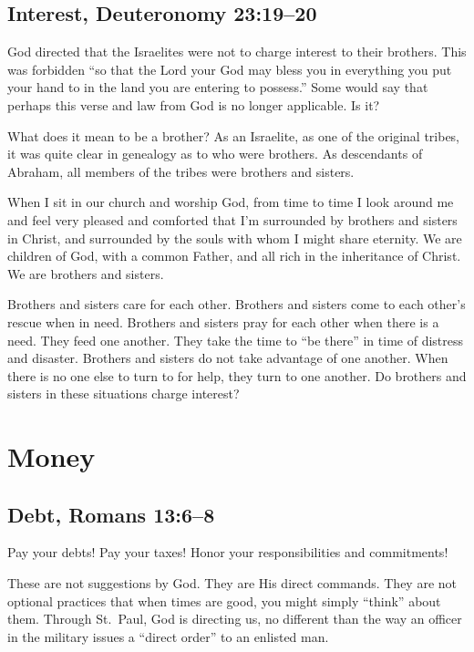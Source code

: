 \documentclass[12pt]{memoir}
\begin{document}
\subsection{Interest, Deuteronomy 23:19--20}

God directed that the Israelites were not to charge interest to their
brothers. This was forbidden ``so that the Lord your God may bless
you in everything you put your hand to in the land you are entering
to possess.'' Some would say that perhaps this verse and law from
God is no longer applicable. Is it?

What does it mean to be a brother? As an Israelite, as one of the
original tribes, it was quite clear in genealogy as to who were brothers.
As descendants of Abraham, all members of the tribes were brothers
and sisters. 

When I sit in our church and worship God, from time to time I look
around me and feel very pleased and comforted that I'm surrounded
by brothers and sisters in Christ, and surrounded by the souls with
whom I might share eternity. We are children of God, with a common
Father, and all rich in the inheritance of Christ. We are brothers
and sisters. 

Brothers and sisters care for each other. Brothers and sisters come
to each other's rescue when in need. Brothers and sisters pray for
each other when there is a need. They feed one another. They take
the time to ``be there'' in time of distress and disaster. Brothers
and sisters do not take advantage of one another. When there is no
one else to turn to for help, they turn to one another. Do brothers
and sisters in these situations charge interest?

\section{Money}

\subsection{Debt, Romans 13:6--8}

Pay your debts! Pay your taxes! Honor your responsibilities and commitments!

These are not suggestions by God. They are His direct commands. They
are not optional practices that when times are good, you might simply
``think'' about them.
Through St.~Paul, God is directing us, no
different than the way an officer in the military issues a ``direct
order'' to an enlisted man.
\end{document}
